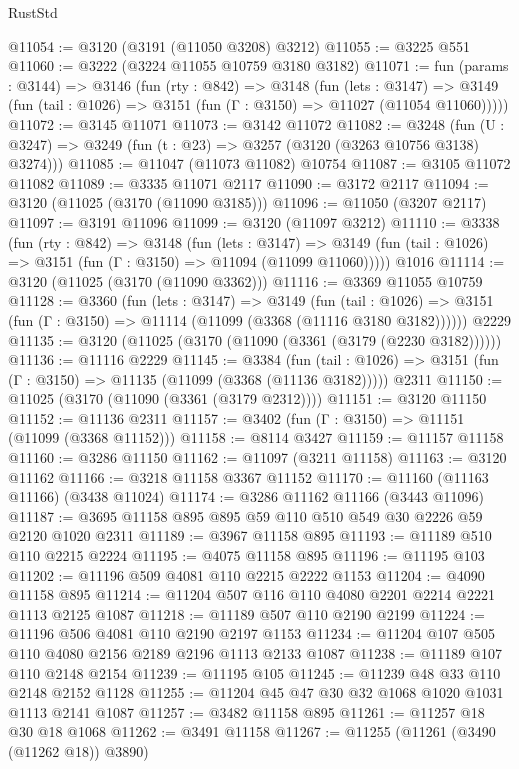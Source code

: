 \begin{lexlean}{RustStd}
\begin{coremodule}
@11054 := @3120 (@3191 (@11050 @3208) @3212)
@11055 := @3225 @551
@11060 := @3222 (@3224 @11055 @10759 @3180 @3182)
@11071 := fun (params : @3144) =>
  @3146
    (fun (rty : @842) =>
    @3148
      (fun (lets : @3147) =>
      @3149 (fun (tail : @1026) => @3151 (fun (Γ : @3150) => @11027 (@11054 @11060)))))
@11072 := @3145 @11071
@11073 := @3142 @11072
@11082 := @3248
    (fun (U : @3247) => @3249 (fun (t : @23) => @3257 (@3120 (@3263 @10756 @3138) @3274)))
@11085 := @11047 (@11073 @11082) @10754
@11087 := @3105 @11072 @11082
@11089 := @3335 @11071 @2117
@11090 := @3172 @2117
@11094 := @3120 (@11025 (@3170 (@11090 @3185)))
@11096 := @11050 (@3207 @2117)
@11097 := @3191 @11096
@11099 := @3120 (@11097 @3212)
@11110 := @3338
    (fun (rty : @842) =>
    @3148
      (fun (lets : @3147) =>
      @3149 (fun (tail : @1026) => @3151 (fun (Γ : @3150) => @11094 (@11099 @11060)))))
    @1016
@11114 := @3120 (@11025 (@3170 (@11090 @3362)))
@11116 := @3369 @11055 @10759
@11128 := @3360
    (fun (lets : @3147) =>
    @3149
      (fun (tail : @1026) =>
      @3151 (fun (Γ : @3150) => @11114 (@11099 (@3368 (@11116 @3180 @3182))))))
    @2229
@11135 := @3120 (@11025 (@3170 (@11090 (@3361 (@3179 (@2230 @3182))))))
@11136 := @11116 @2229
@11145 := @3384
    (fun (tail : @1026) => @3151 (fun (Γ : @3150) => @11135 (@11099 (@3368 (@11136 @3182)))))
    @2311
@11150 := @11025 (@3170 (@11090 (@3361 (@3179 @2312))))
@11151 := @3120 @11150
@11152 := @11136 @2311
@11157 := @3402 (fun (Γ : @3150) => @11151 (@11099 (@3368 @11152)))
@11158 := @8114 @3427
@11159 := @11157 @11158
@11160 := @3286 @11150
@11162 := @11097 (@3211 @11158)
@11163 := @3120 @11162
@11166 := @3218 @11158 @3367 @11152
@11170 := @11160 (@11163 @11166) (@3438 @11024)
@11174 := @3286 @11162 @11166 (@3443 @11096)
@11187 := @3695 @11158 @895 @895 @59 @110 @510 @549 @30 @2226 @59 @2120 @1020 @2311
@11189 := @3967 @11158 @895
@11193 := @11189 @510 @110 @2215 @2224
@11195 := @4075 @11158 @895
@11196 := @11195 @103
@11202 := @11196 @509 @4081 @110 @2215 @2222 @1153
@11204 := @4090 @11158 @895
@11214 := @11204 @507 @116 @110 @4080 @2201 @2214 @2221 @1113 @2125 @1087
@11218 := @11189 @507 @110 @2190 @2199
@11224 := @11196 @506 @4081 @110 @2190 @2197 @1153
@11234 := @11204 @107 @505 @110 @4080 @2156 @2189 @2196 @1113 @2133 @1087
@11238 := @11189 @107 @110 @2148 @2154
@11239 := @11195 @105
@11245 := @11239 @48 @33 @110 @2148 @2152 @1128
@11255 := @11204 @45 @47 @30 @32 @1068 @1020 @1031 @1113 @2141 @1087
@11257 := @3482 @11158 @895
@11261 := @11257 @18 @30 @18 @1068
@11262 := @3491 @11158
@11267 := @11255 (@11261 (@3490 (@11262 @18)) @3890)

\end{coremodule}
\end{lexlean}
